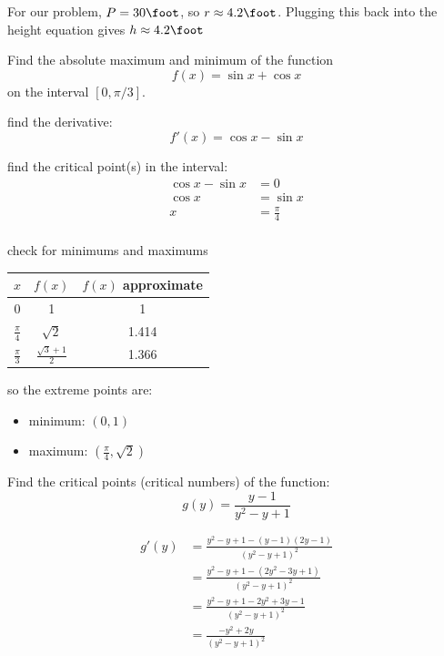 \documentclass[fleqn,addpoints]{exam}
\begin{document}
\begin{questions}
\begin{solution}
For our problem, $P = 30 \foot$, so $r \approx 4.2 \foot$.  Plugging this back into the height equation gives $h \approx 4.2 \foot$


\end{solution}
\question
Find the absolute maximum and minimum of the function 
\[ 
  f(x) = \sin x + \cos x
\]
on the interval $[0, \pi/3]$.

\begin{solution}
find the derivative: 
\[
  f'(x) = \cos x - \sin x
\]

find the critical point(s) in the interval:
\begin{align*}
  \cos x - \sin x &= 0 \\
  \cos x &= \sin x \\
  x &= \frac{\pi}{4} \\
\end{align*}

check for minimums and maximums

\begin{tabular}{ccc}
\toprule
$x$ & $f(x)$ & $f(x)$ approximate \\
\midrule
0                 &                      1 &       1 \\
$\frac{\pi}{4}$   &               $\sqrt{2}$ & 1.414 \\
$\frac{\pi}{3}$   & $\frac{\sqrt{3} + 1}{2}$ & 1.366 \\
\bottomrule
\end{tabular}

so the extreme points are:
\begin{itemize}
\item minimum: $(0, 1)$
\item maximum: $\left(\frac{\pi}{4}, \sqrt{2}\right)$
\end{itemize}

\end{solution}

\ifprintanswers
\pagebreak
\fi

\question
Find the critical points (critical numbers) of the function:
\[
  g(y) = \frac{y - 1}{y^2 - y + 1}
\]

\begin{solution}
\begin{align*}
  g'(y) &= \frac{y^2 - y + 1 - (y - 1)(2y - 1)}{(y^2 - y + 1)^2} \\
        &= \frac{y^2 - y + 1 - (2y^2 - 3y + 1)}{(y^2 - y + 1)^2} \\
        &= \frac{y^2 - y + 1 - 2y^2 + 3y - 1}{(y^2 - y + 1)^2} \\
        &= \frac{-y^2 + 2y}{(y^2 - y + 1)^2} \\
\end{align*}


\end{solution}
\end{questions}
\end{document}
